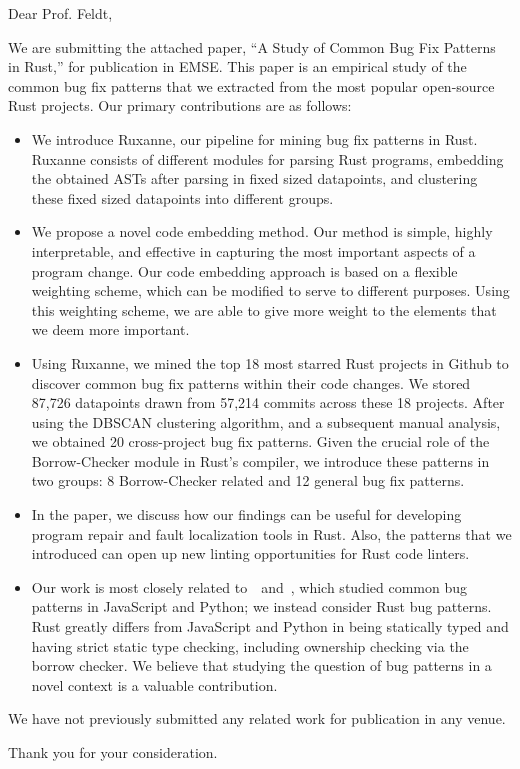\documentclass{letter}
\begin{document}
\begin{letter}{}
\opening{Dear Prof. Feldt,}

We are submitting the attached paper, ``A Study of Common Bug Fix Patterns in Rust,'' for publication in EMSE. This paper is an empirical study of the common bug fix patterns that we extracted from the most popular open-source Rust projects. Our primary contributions are as follows:

\begin{itemize}
    \item We introduce Ruxanne, our pipeline for mining bug fix patterns in Rust. Ruxanne consists of different modules for parsing Rust programs, embedding the obtained ASTs after parsing in fixed sized datapoints, and clustering these fixed sized datapoints into different groups. 
    \item We propose a novel code embedding method. Our method is simple, highly interpretable, and effective in capturing the most important aspects of a program change. Our code embedding approach is based on a flexible weighting scheme, which can be modified to serve to different purposes. Using this weighting scheme, we are able to give more weight to the elements that we deem more important. %
    \item Using Ruxanne, we mined the top 18 most starred Rust projects in Github to discover common bug fix patterns within their code changes. We stored 87,726 datapoints drawn from 57,214 commits across these 18 projects. After using the DBSCAN clustering algorithm, and a subsequent manual analysis, we obtained 20 cross-project bug fix patterns. Given the crucial role of the Borrow-Checker module in Rust's compiler, we introduce these patterns in two groups: 8 Borrow-Checker related and 12 general bug fix patterns.
    \item In the paper, we discuss how our findings can be useful for developing program repair and fault localization tools in Rust. Also, the patterns that we introduced can open up new linting opportunities for Rust code linters. 
    \item Our work is most closely related to~\cite{hanam2016discovering}~and~\cite{yang2022mining}, which studied common bug patterns in JavaScript and Python; we instead consider Rust bug patterns. Rust greatly differs from JavaScript and Python in being statically typed and having strict static type checking, including ownership checking via the borrow checker. We believe that studying the question of bug patterns in a novel context is a valuable contribution.
\end{itemize}

We have not previously submitted any related work for publication in any venue. 

\closing{Thank you for your consideration.}

\small



\end{letter} 
\end{document}
